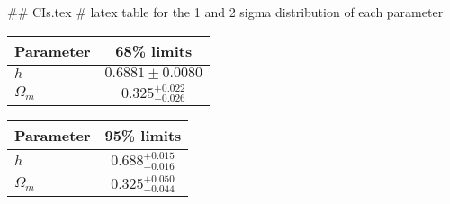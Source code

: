## CIs.tex
# latex table for the 1 and 2 sigma distribution of each parameter

\begin{tabular} { l  c}
 Parameter &  68\% limits\\
\hline
{\boldmath$h              $} & $0.6881\pm 0.0080          $\\
{\boldmath$\Omega_m       $} & $0.325^{+0.022}_{-0.026}   $\\
\hline
\end{tabular}

\begin{tabular} { l  c}
 Parameter &  95\% limits\\
\hline
{\boldmath$h              $} & $0.688^{+0.015}_{-0.016}   $\\
{\boldmath$\Omega_m       $} & $0.325^{+0.050}_{-0.044}   $\\
\hline
\end{tabular}
